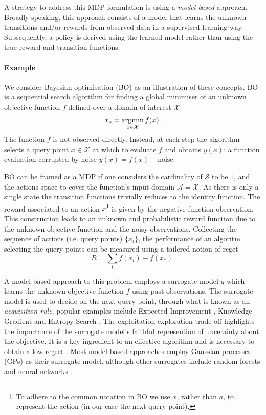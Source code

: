 A strategy to address this MDP formulation is using a \emph{model-based} approach. Broadly speaking, this approach consists of a model that learns the unknown transitions and/or rewards from observed data in a supervised learning way. Subsequently, a policy is derived using the learned model rather than using the true reward and transition functions. %

\paragraph{Example}
We consider Bayesian optimisation (BO) \citep{movckus1975bayesian} as an illustration of these concepts. BO is a sequential search algorithm for finding a global minimiser of an unknown objective function $f$ defined over a domain of interest $\mathcal{X}$
\begin{equation}
    x_* = \operatorname*{\arg\!\min}_{x \in \mathcal{X}} f(x).
\end{equation}
The function $f$ is not observed directly. Instead, at each step the algorithm selects a query point $x \in \mathcal{X}$ at which to evaluate $f$ and obtains $y(x)$: a function evaluation corrupted by noise $y(x) = f(x) + \textrm{noise}$.

BO can be framed as a MDP if one considers the cardinality of $\mathcal{S}$ to be $1$, and the actions space to cover the function's input domain $\mathcal{A} = \mathcal{X}$. As there is only a single state the transition functions trivially reduces to the identity function. The reward associated to an action $x$\footnote{To adhere to the common notation in BO we use $x$, rather than $a$, to represent the action (in our case the next query point).} is given by the negative function observation. This construction leads to an unknown and probabilistic reward  function due to the unknown objective function and the noisy observations. Collecting the sequence of actions (i.e. query points) $\{x_t\}$, the performance of an algoritm selecting the query points can be measured using a tailered notion of reget
\begin{equation}
    R = \sum_t f(x_t) - f(x_*).
\end{equation}

A model-based approach to this problem employs a surrogate model $g$ which learns the unknown objective function $f$ using past observations. The surrogate model is used to decide on the next query point, through what is known as an \emph{acquisition rule},
popular examples include Expected Improvement \citep{jones1998efficient}, Knowledge Gradient \citep{frazier2009knowledge} and Entropy Search \citep{hennig2012entropy}. The exploitation-exploration trade-off highlights the importance of the surrogate model's faithful represention of uncerainty about the objective. It is a key ingredient to an effective algorithm and is necessary to obtain a low regret \citep{srinivas2009gaussian}. Most model-based approaches employ Gaussian processes (GPs) as their surrogate model, although other surrogates include random forests \citep{hutter2014efficient} and neural networks \citep{snoek2015scalable}.

